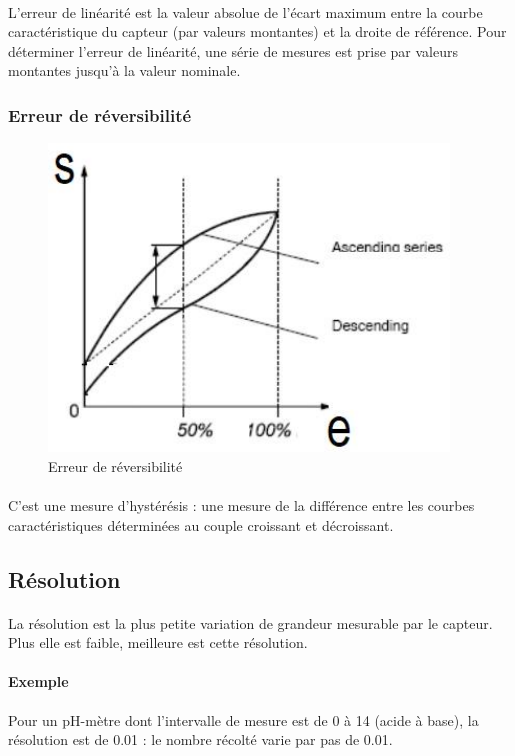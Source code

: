 \documentclass{article}
\begin{document}
            \paragraph{}
            L'erreur de linéarité est la valeur absolue de l'écart maximum entre la courbe caractéristique du capteur (par valeurs montantes) et la droite de référence. Pour déterminer l'erreur de linéarité, une série de mesures est prise par valeurs montantes jusqu'à la valeur nominale.

            \subsubsection{Erreur de réversibilité}
            \begin{figure}[H]
                \centering
                \includegraphics[width=0.4\linewidth]{./images/005-erreur-reversibilite.png}
                \caption{Erreur de réversibilité}
            \end{figure}

            \paragraph{}
            C'est une mesure d'hystérésis : une mesure de la différence entre les courbes caractéristiques déterminées au couple croissant et décroissant.

        \subsection{Résolution}
        \paragraph{}
        La résolution est la plus petite variation de grandeur mesurable par le capteur. Plus elle est faible, meilleure est cette résolution.

        \paragraph{Exemple}
        Pour un pH-mètre dont l'intervalle de mesure est de 0 à 14 (acide à base), la résolution est de 0.01 : le nombre récolté varie par pas de 0.01.
\end{document}
